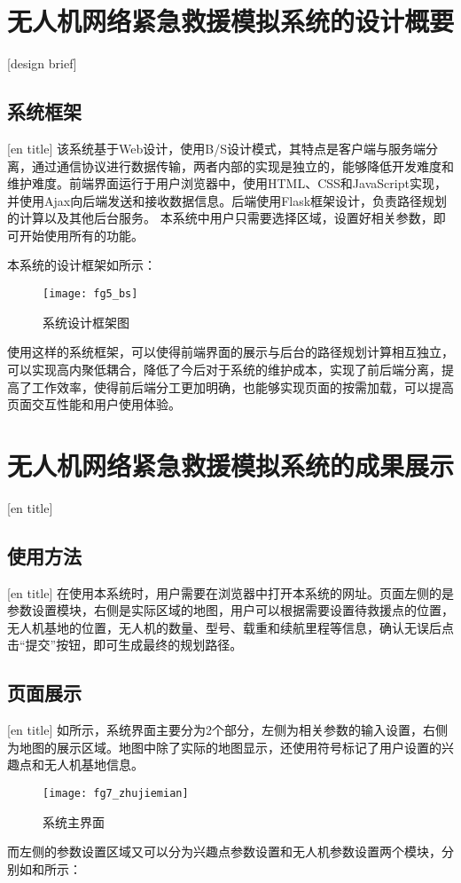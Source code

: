 \section{无人机网络紧急救援模拟系统的设计概要}[design brief]
\subsection{系统框架}[en title]
该系统基于Web设计，使用B/S设计模式，其特点是客户端与服务端分离，通过通信协议进行数据传输，两者内部的实现是独立的，能够降低开发难度和维护难度。前端界面运行于用户浏览器中，使用HTML、CSS和JavaScript实现，并使用Ajax向后端发送和接收数据信息。后端使用Flask框架设计，负责路径规划的计算以及其他后台服务。
本系统中用户只需要选择区域，设置好相关参数，即可开始使用所有的功能。


本系统的设计框架如所示：

\begin{figure}[ht]
	\centering
	\texttt{[image: fg5\_bs]}
	\caption{系统设计框架图}
	\label{fg601}
\end{figure}


使用这样的系统框架，可以使得前端界面的展示与后台的路径规划计算相互独立，可以实现高内聚低耦合，降低了今后对于系统的维护成本，实现了前后端分离，提高了工作效率，使得前后端分工更加明确，也能够实现页面的按需加载，可以提高页面交互性能和用户使用体验。

\section{无人机网络紧急救援模拟系统的成果展示}[en title]
\subsection{使用方法}[en title]
在使用本系统时，用户需要在浏览器中打开本系统的网址。页面左侧的是参数设置模块，右侧是实际区域的地图，用户可以根据需要设置待救援点的位置，无人机基地的位置，无人机的数量、型号、载重和续航里程等信息，确认无误后点击“提交”按钮，即可生成最终的规划路径。
\subsection{页面展示}[en title]
如所示，系统界面主要分为2个部分，左侧为相关参数的输入设置，右侧为地图的展示区域。地图中除了实际的地图显示，还使用符号标记了用户设置的兴趣点和无人机基地信息。

\begin{figure}[H]
	\centering
	\texttt{[image: fg7\_zhujiemian]}
	\caption{系统主界面}
	\label{fg602}
\end{figure}
而左侧的参数设置区域又可以分为兴趣点参数设置和无人机参数设置两个模块，分别如和所示：

